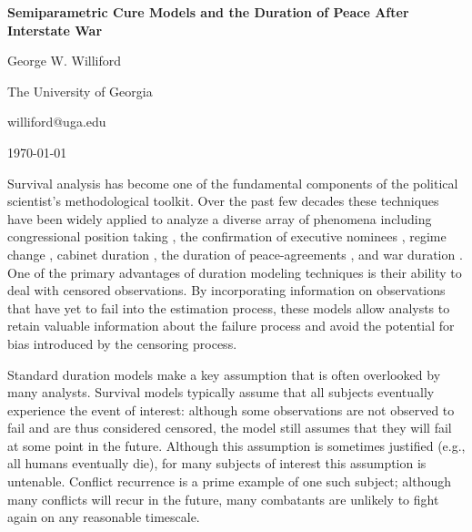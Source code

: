 


\begin{center}
\textbf{Semiparametric Cure Models and the Duration of Peace After Interstate War}

George W. Williford

The University of Georgia

williford@uga.edu

\today

\vspace{8cm}



\end{center}

\pagebreak

Survival analysis has become one of the fundamental components of the political scientist's methodological toolkit. Over the past few decades these techniques have been widely applied to analyze a diverse array of phenomena including  congressional position taking \citep{box-steffensmeier1997}, the confirmation of executive nominees \citep{ostrander2015}, regime change \citep{gates2016}, cabinet duration \citep{somer-topcu2008}, the duration of peace-agreements \citep{fortna2004b}, and war duration \citep{weisiger2013}. One of the primary advantages of duration modeling techniques is their ability to deal with censored observations. By incorporating information on observations that have yet to fail into the estimation process, these models allow analysts to retain valuable information about the failure process and avoid the potential for bias introduced by the censoring process. 

Standard duration models make a key assumption that is often overlooked by many analysts. Survival models typically assume that all subjects eventually experience the event of interest: although some observations are not observed to fail and are thus considered censored, the model still assumes that they will fail at some point in the future. Although this assumption is sometimes justified (e.g., all humans eventually die), for many subjects of interest this assumption is untenable. Conflict recurrence is a prime example of one such subject; although many conflicts will recur in the future, many combatants are unlikely to fight again on any reasonable timescale. 

